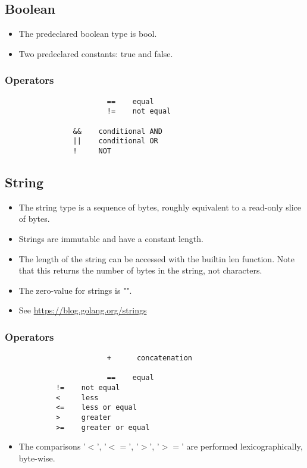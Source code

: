 \documentclass{article}
\begin{document}
	\subsection{Boolean}
		\begin{itemize}
			\item The predeclared boolean type is \colorbox{code}{bool}.
			\item Two predeclared constants: \colorbox{code}{true} and \colorbox{code}{false}.
		\end{itemize}
		\subsubsection{Operators}
			\begin{verbatim}
		    			==    equal
	    				!=    not equal
		
	    		&&    conditional AND    
    			||    conditional OR    
    			!     NOT               
			\end{verbatim}
			
	\subsection{String}
		\begin{itemize}
			\item The \colorbox{code}{string} type is a sequence of bytes, roughly equivalent to a read-only slice of bytes. 
			\item Strings are immutable and have a constant length. 
			\item The length of the string can be accessed with the builtin \colorbox{code}{len} function. Note that this returns the number of bytes in the string, not characters. 
			\item The zero-value for strings is \colorbox{code}{""}.
			\item See \url{https://blog.golang.org/strings}
		\end{itemize} 
		\subsubsection{Operators}
			\begin{verbatim}
	    				+ 	   concatenation
					
		    			==    equal
	    	!=    not equal
	    	<     less
	    	<=    less or equal
	    	>     greater
	    	>=    greater or equal
			\end{verbatim}
			\begin{itemize}
				\item The comparisons '$<$', '$<=$', '$>$', '$>=$' are performed lexicographically, byte-wise. 
			\end{itemize}
	
\end{document}

